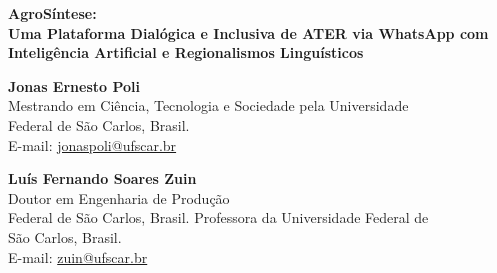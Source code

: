 







\begin{center}
	\textbf{\LARGE AgroSíntese:}\\[0.5em]
	\textbf{\LARGE Uma Plataforma Dialógica e Inclusiva de ATER via WhatsApp com Inteligência Artificial e Regionalismos Linguísticos}\\[0.5em]
\end{center}

\vspace{2em}

\begin{center}
	\textbf{Jonas Ernesto Poli}\\
	Mestrando em Ciência, Tecnologia e Sociedade pela Universidade\\
	Federal de São Carlos, Brasil.\\
	E-mail: \href{mailto:jonaspoli@ufscar.br}{jonaspoli@ufscar.br}
\end{center}

\vspace{2em}

\begin{center}
	\textbf{Luís Fernando Soares Zuin}\\
    Doutor em Engenharia de Produção\\
	Federal de São Carlos, Brasil. Professora da Universidade Federal de\\
	São Carlos, Brasil.\\
	E-mail: \href{mailto:zuin@ufscar.br}{zuin@ufscar.br}
\end{center}
	
	
	
